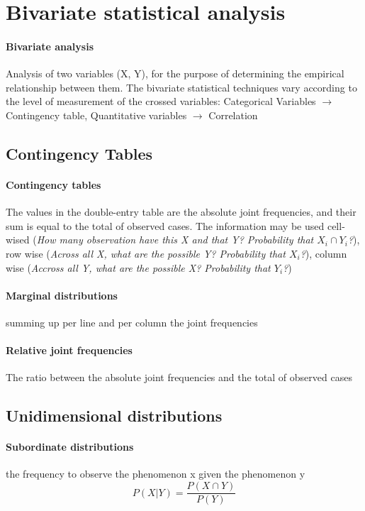 \documentclass[11pt]{article}
\begin{document}
    \section{Bivariate statistical analysis}
    
    \paragraph{Bivariate analysis} Analysis of two variables (X, Y), for the purpose of determining the empirical relationship between
    them. The bivariate statistical techniques vary according to the level of measurement
    of the crossed variables: Categorical Variables $\rightarrow$ Contingency table, Quantitative variables $\rightarrow$ Correlation

    \subsection{Contingency Tables}
    
    \paragraph{Contingency tables} The values in the  double-entry table are the
    absolute joint frequencies, and their sum is equal to the total of observed
    cases. The information may be used cell-wised (\textit{How many observation have this X and that Y? Probability that $X_i \cap Y_i$?}), 
    row wise (\textit{Across all X, what are the possible Y? Probability that $X_i$?}), 
    column wise (\textit{Accross all Y, what are the possible X? Probability that $Y_i$?})
    
    \paragraph{Marginal distributions} summing up per line and per column the joint frequencies
    \paragraph{Relative joint frequencies} The ratio between the absolute joint frequencies and the total of observed cases
    
    \subsection{Unidimensional distributions}
    
    \paragraph{Subordinate distributions} the frequency to observe the phenomenon x given
    the phenomenon y 
    $$P(X|Y) = \frac{P(X \cap Y)}{P(Y)}$$
\end{document}
